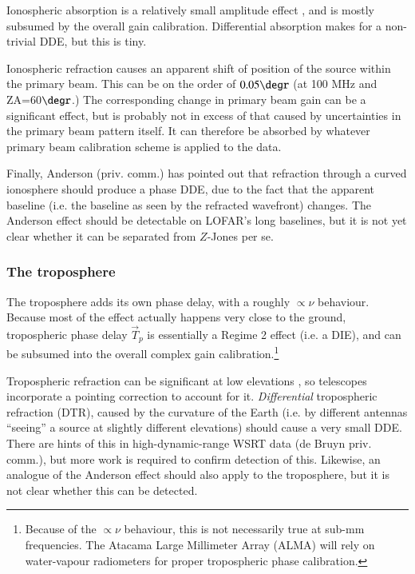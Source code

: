 \documentclass[]{aa}
\newcommand{\jones}[2]{\vec {#1}_{#2}}
\begin{document}
Ionospheric absorption is a relatively small amplitude effect \citep[e.g. 0.1 dB at 100 MHz and ZA=60$\degr$, see][]{tms}, and is mostly subsumed by the overall gain calibration. Differential absorption makes for a non-trivial DDE, but this is tiny.

Ionospheric refraction causes an apparent shift of position of the source within the primary beam. This can be on the order of $0.05\degr$ (at 100 MHz and ZA=60$\degr$.) The corresponding change in primary beam gain can be a significant effect, but is probably not in excess of that caused by uncertainties in the primary beam pattern itself. It can therefore be absorbed by whatever primary beam calibration scheme is applied to the data.

Finally, Anderson (priv. comm.) has pointed out that refraction through a curved ionosphere should produce a phase DDE, due to the fact that the apparent baseline (i.e. the baseline as seen by the refracted wavefront) changes. The Anderson effect should be detectable on LOFAR's long baselines, but it is not yet clear whether it can be separated from $Z$-Jones per se.
 
\subsubsection{The troposphere\label{sec:troposphere}}

The troposphere adds its own phase delay, with a roughly $\propto\nu$ behaviour. Because most of the effect actually happens very close to the ground, tropospheric phase delay $\jones{T}{p}$ is essentially a Regime 2 effect (i.e. a DIE), and can be subsumed into the overall complex gain calibration.\footnote{Because of the $\propto\nu$ behaviour, this is not necessarily true at sub-mm frequencies. The Atacama Large Millimeter Array (ALMA) will rely on water-vapour radiometers for proper tropospheric phase calibration.}

Tropospheric refraction can be significant at low elevations \citep[Sect~10.1]{tms}, so telescopes incorporate a pointing correction to account for it. \emph{Differential} tropospheric refraction (DTR), caused by the curvature of the Earth (i.e. by different antennas ``seeing'' a source at slightly different elevations) should cause a very small DDE. There are hints of this in high-dynamic-range WSRT data (de Bruyn priv. comm.), but more work is required to confirm detection of this. Likewise, an analogue of the Anderson effect should also apply to the troposphere, but it is not clear whether this can be detected.
\end{document}
